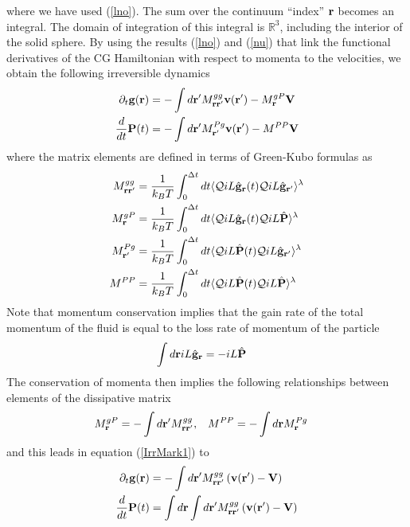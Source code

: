 \documentclass[b5paper,openright,10pt]{book}
\begin{document}
where we have  used (\ref{lno}). The sum over  the continuum ``index''
${\bf  r}$ becomes  an integral.   The domain  of integration  of this
integral  is  $\mathbb{R}^3$,  including  the interior  of  the  solid
sphere. By  using the  results (\ref{lno}) and  (\ref{nu}) that  link the
functional derivatives of  the CG Hamiltonian with  respect to momenta
to the velocities, we obtain the following irreversible dynamics
\begin{align}
  \partial_t{\bf g}({\bf r})&=-\int d{\bf r}'M^{gg}_{{\bf r}{\bf r}'}
{\bf v}({\bf r}')-M^{gP}_{\bf r}{\bf V}
\nonumber\\
\frac{d}{dt}{\bf P}(t)&=-\int d{\bf r}' M^{Pg}_{{\bf r}'}{\bf v}({\bf r}')-M^{PP}{\bf V}
\label{IrrMark1}\end{align}
where the matrix elements are  defined in terms of Green-Kubo formulas
as
\begin{align}
  M^{gg}_{{\bf r}{\bf r}'}&=\frac{1}{k_BT}\int_0^{\Delta t} dt\langle 
{\cal Q}  iL\hat{\bf g}_{{\bf r}}(t){\cal Q}  iL\hat{\bf g}_{{\bf r}'}\rangle^\lambda
\nonumber\\
  M^{gP}_{{\bf r}}&=\frac{1}{k_BT}\int_0^{\Delta t} dt\langle 
{\cal Q}  iL\hat{\bf g}_{\bf r}(t){\cal Q}  iL\hat{\bf P}\rangle^\lambda
\nonumber\\
  M^{Pg}_{{\bf r}'}&=\frac{1}{k_BT}\int_0^{\Delta t} dt\langle 
{\cal Q}  iL\hat{\bf P}(t){\cal Q}  iL\hat{\bf g}_{{\bf r}'}\rangle^\lambda
\nonumber\\
  M^{PP}&=\frac{1}{k_BT}\int_0^{\Delta t} dt\langle 
{\cal Q}  iL\hat{\bf P}(t){\cal Q}  iL\hat{\bf P}\rangle^\lambda
\nonumber\\
\label{Ms}
\end{align}
Note that momentum conservation implies that the gain rate of the total momentum
of the fluid is equal to the loss rate of momentum of the particle
\begin{align}
  \int d{\bf r} iL\hat{\bf g}_{\bf r}&=-iL\hat{\bf P}
\label{iLgiLP}
\end{align}
The conservation of momenta then implies the following relationships between
elements of the dissipative matrix
\begin{align}
    M^{gP}_{{\bf r}}&=-\int d{\bf r}'M^{gg}_{{\bf r}{\bf r}'},&&
M^{PP}= - \int d{\bf r}M^{Pg}_{{\bf r}}
\end{align}
and this leads in equation (\ref{IrrMark1}) to 
\begin{align}
  \partial_t{\bf g}({\bf r})&=-\int d{\bf r}'M^{gg}_{{\bf r}{\bf r}'}\left({\bf v}({\bf r}')-{\bf V}\right)
\nonumber\\
\frac{d}{dt}{\bf P}(t)&=\int d{\bf r}\int d{\bf r}'M^{gg}_{{\bf r}{\bf r}'}\left({\bf v}({\bf r}')-{\bf V}\right)
\label{IrrMark2}\end{align}
\end{document}
